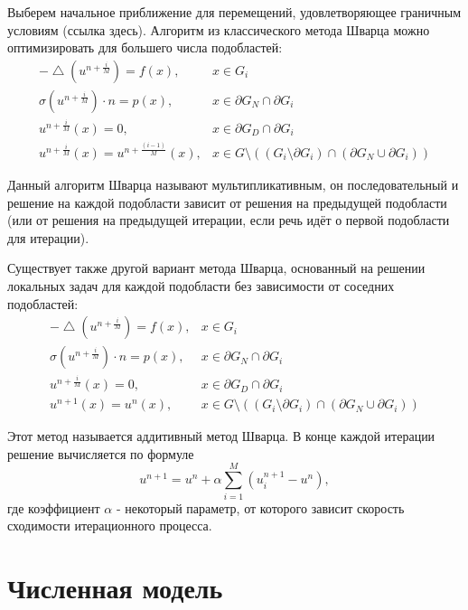 \documentclass[a4paper]{article}
\begin{document}
Выберем начальное приближение для перемещений, удовлетворяющее граничным условиям (ссылка здесь). Алгоритм из классического метода Шварца можно оптимизировать для большего числа подобластей:
\begin{equation*}
\begin{array}{rl}
-\bigtriangleup \! (u^{n+\frac{i}{M}}) = f(x), & x \in G_i \\
\sigma(u^{n+\frac{i}{M}}) \cdot n = p(x), & x \in \partial G_N \cap \partial G_i \\
u^{n+\frac{i}{M}}(x) = 0, & x \in \partial G_D \cap \partial G_i \\ 
u^{n+\frac{i}{M}}(x) = u^{n+\frac{(i - 1)}{M}}(x), & x \in G \setminus ((G_i \setminus \partial G_i) \cap (\partial G_N \cup \partial G_i))
\end{array}
\end{equation*}

Данный алгоритм Шварца называют мультипликативным, он последовательный и решение на каждой подобласти зависит от решения на предыдущей подобласти (или от решения на предыдущей итерации, если речь идёт о первой подобласти для итерации).

Существует также другой вариант метода Шварца, основанный на решении локальных задач для каждой подобласти без зависимости от соседних подобластей:
\begin{equation*}
\begin{array}{rl}
-\bigtriangleup \! (u^{n+\frac{i}{M}}) = f(x), & x \in G_i \\
\sigma(u^{n+\frac{i}{M}}) \cdot n = p(x), & x \in \partial G_N \cap \partial G_i \\
u^{n+\frac{i}{M}}(x) = 0, & x \in \partial G_D \cap \partial G_i \\ 
u^{n+1}(x) = u^{n}(x), & x \in G \setminus ((G_i \setminus \partial G_i) \cap (\partial G_N \cup \partial G_i))
\end{array}
\end{equation*}

Этот метод называется аддитивный метод Шварца. В конце каждой итерации решение вычисляется по формуле 
\begin{equation*}
u^{n+1} = u^{n} + \alpha \sum_{i=1}^{M} (u_i^{n+1} - u^{n}),
\end{equation*}
где коэффициент $\alpha$ - некоторый параметр, от которого зависит скорость сходимости итерационного процесса. 

\newpage

\section{Численная модель}
\end{document}
